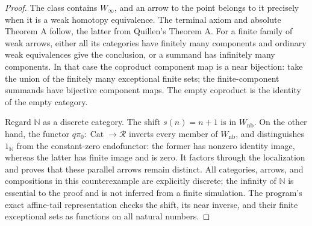 \begin{proof}
The class contains $W_\infty$, and an arrow to the point belongs to
it precisely when it is a weak homotopy equivalence. The terminal
axiom and absolute Theorem A follow, the latter from Quillen's
Theorem A. For a finite family of weak arrows, either all its
categories have finitely many components and ordinary weak
equivalences give the conclusion, or a summand has infinitely many
components. In that case the coproduct component map is a near
bijection: take the union of the finitely many exceptional finite
sets; the finite-component summands have bijective component maps.
The empty coproduct is the identity of the empty category.

Regard $\mathbb N$ as a discrete category. The shift
$s(n)=n+1$ is in $W_{\mathrm{nb}}$. On the other hand, the functor
$q\pi_0:\operatorname{Cat}\to\mathscr R$ inverts every member of
$W_{\mathrm{nb}}$, and distinguishes $1_{\mathbb N}$ from the
constant-zero endofunctor: the former has nonzero identity image,
whereas the latter has finite image and is zero. It factors through
the localization and proves that these parallel arrows remain
distinct. All categories, arrows, and compositions in this
counterexample are explicitly discrete; the infinity of
$\mathbb N$ is essential to the proof and is not inferred from a
finite simulation. The program's exact affine-tail representation
checks the shift, its near inverse, and their finite exceptional
sets as functions on all natural numbers.
\end{proof}

